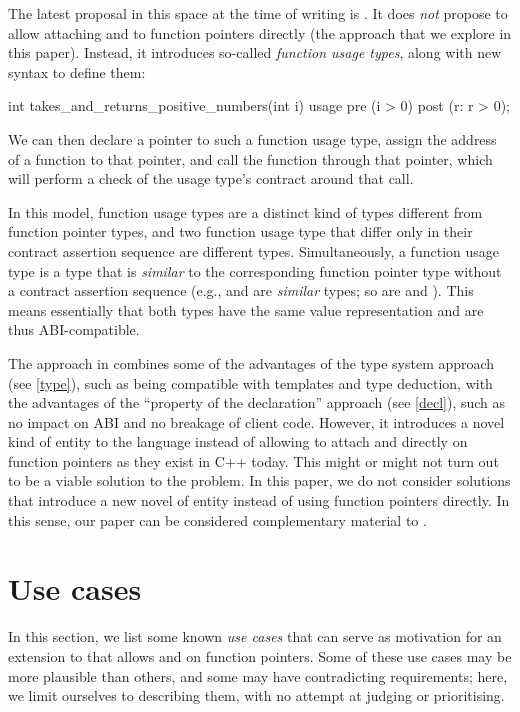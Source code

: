 The latest proposal in this space at the time of writing is \cite{P3271R0}. It does \emph{not} propose to allow attaching  and  to function pointers directly (the approach that we explore in this paper). Instead, it introduces so-called \emph{function usage types}, along with new syntax to define them:
\begin{codeblock}
int takes_and_returns_positive_numbers(int i) usage 
  pre (i > 0)
  post (r: r > 0);
\end{codeblock}
We can then declare a pointer to such a function usage type, assign the address of a function to that pointer, and call the function through that pointer, which will perform a check of the usage type's contract around that call.

In this model, function usage types are a distinct kind of types different from function pointer types, and two function usage type that differ only in their contract assertion sequence are different types. Simultaneously, a function usage type is a type that is \emph{similar} to the corresponding function pointer type without a contract assertion sequence (e.g.,  and  are \emph{similar} types; so are  and ). This means essentially that both types have the same value representation and are thus ABI-compatible.

The approach in \cite{P3271R0} combines some of the advantages of the type system approach (see \ref{type}), such as being compatible with templates and type deduction, with the advantages of the ``property of the declaration'' approach (see \ref{decl}), such as no impact on ABI and no breakage of client code. However, it introduces a novel kind of entity to the language instead of allowing to attach  and  directly on function pointers as they exist in C++ today. This might or might not turn out to be a viable solution to the problem. In this paper, we do not consider solutions that introduce a new novel of entity instead of using function pointers directly. In this sense, our paper can be considered complementary material to \cite{P3271R0}.

\section{Use cases}
\label{usecases}

In this section, we list some known \emph{use cases} that can serve as motivation for an extension to \cite{P2900R8} that allows  and  on function pointers. Some of these use cases may be more plausible than others, and some may have contradicting requirements; here, we limit ourselves to describing them, with no attempt at judging or prioritising.

